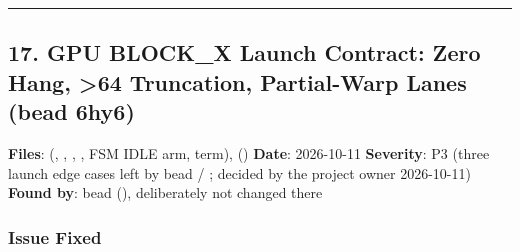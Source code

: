 \begin{record}
\begin{center}\rule{0.5\linewidth}{0.5pt}\end{center}

\end{record}

\subsection{17. GPU BLOCK\_X Launch Contract: Zero Hang, \textgreater64
Truncation, Partial-Warp Lanes (bead 6hy6)}\label{cr:fix:fixes-index:17-gpu-block-x-launch-contract-zero-hang-64-truncation-partial-warp-lanes-bead-6hy6}

\begin{record}

\textbf{Files}:  (,
, , , FSM IDLE
arm,  term), 
() \textbf{Date}: 2026-10-11 \textbf{Severity}: P3
(three launch edge cases left by bead  / ; decided by the
project owner 2026-10-11) \textbf{Found by}: bead 
(), deliberately not changed there

\end{record}

\subsubsection{Issue Fixed}\label{cr:fix:fixes-index:issue-fixed-10}

